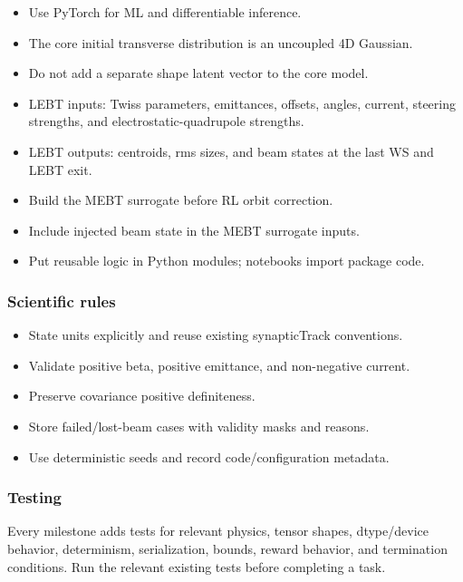 \documentclass[
]{article}
\providecommand{\tightlist}{%
  \setlength{\itemsep}{0pt}\setlength{\parskip}{0pt}}
\begin{document}
\begin{itemize}
\tightlist
\item
  Use PyTorch for ML and differentiable inference.
\item
  The core initial transverse distribution is an uncoupled 4D Gaussian.
\item
  Do not add a separate shape latent vector to the core model.
\item
  LEBT inputs: Twiss parameters, emittances, offsets, angles, current,
  steering strengths, and electrostatic-quadrupole strengths.
\item
  LEBT outputs: centroids, rms sizes, and beam states at the last WS and
  LEBT exit.
\item
  Build the MEBT surrogate before RL orbit correction.
\item
  Include injected beam state in the MEBT surrogate inputs.
\item
  Put reusable logic in Python modules; notebooks import package code.
\end{itemize}

\hypertarget{scientific-rules}{%
\subsubsection{Scientific rules}\label{scientific-rules}}

\begin{itemize}
\tightlist
\item
  State units explicitly and reuse existing synapticTrack conventions.
\item
  Validate positive beta, positive emittance, and non-negative current.
\item
  Preserve covariance positive definiteness.
\item
  Store failed/lost-beam cases with validity masks and reasons.
\item
  Use deterministic seeds and record code/configuration metadata.
\end{itemize}

\hypertarget{testing-1}{%
\subsubsection{Testing}\label{testing-1}}

Every milestone adds tests for relevant physics, tensor shapes,
dtype/device behavior, determinism, serialization, bounds, reward
behavior, and termination conditions. Run the relevant existing tests
before completing a task.
\end{document}
